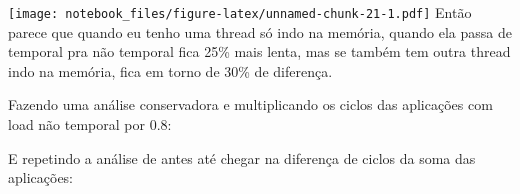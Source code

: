 \documentclass[
]{article}
\newenvironment{Shaded}{\begin{snugshade}}{\end{snugshade}}
\newcommand{\DataTypeTok}[1]{\textcolor[rgb]{0.13,0.29,0.53}{#1}}
\newcommand{\FloatTok}[1]{\textcolor[rgb]{0.00,0.00,0.81}{#1}}
\newcommand{\KeywordTok}[1]{\textcolor[rgb]{0.13,0.29,0.53}{\textbf{#1}}}
\newcommand{\NormalTok}[1]{#1}
\newcommand{\OperatorTok}[1]{\textcolor[rgb]{0.81,0.36,0.00}{\textbf{#1}}}
\newcommand{\StringTok}[1]{\textcolor[rgb]{0.31,0.60,0.02}{#1}}
\begin{document}
\texttt{[image: notebook\_files/figure-latex/unnamed-chunk-21-1.pdf]}
Então parece que quando eu tenho uma thread só indo na memória, quando
ela passa de temporal pra não temporal fica 25\% mais lenta, mas se
também tem outra thread indo na memória, fica em torno de 30\% de
diferença.

Fazendo uma análise conservadora e multiplicando os ciclos das
aplicações com load não temporal por 0.8:

\begin{Shaded}
\end{Shaded}

E repetindo a análise de antes até chegar na diferença de ciclos da soma
das aplicações:
\end{document}

